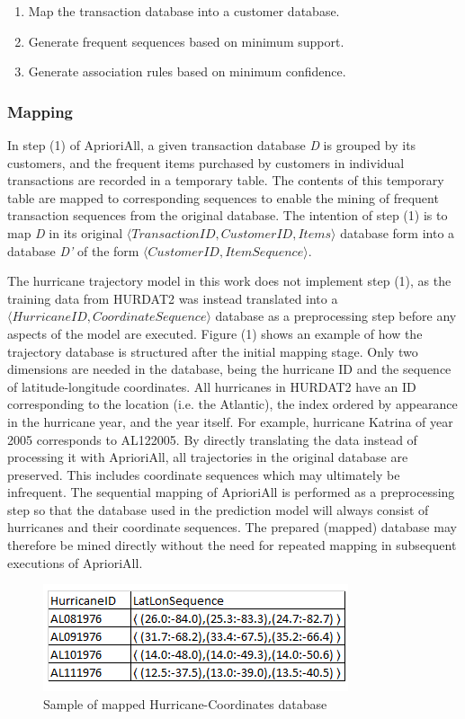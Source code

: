 \documentclass[12pt,conference]{IEEEtran}
\begin{document}
\begin{enumerate}
\item Map the transaction database into a customer database.
\item Generate frequent sequences based on minimum support.
\item Generate association rules based on minimum confidence.
\end{enumerate}

\subsubsection{Mapping}

In step (1) of AprioriAll, a given transaction database \textit{D} is grouped by its customers, and the frequent items purchased by customers in individual transactions are recorded in a temporary table. The contents of this temporary table are mapped to corresponding sequences to enable the mining of frequent transaction sequences from the original database. The intention of step (1) is to map \textit{D} in its original $\langle TransactionID, CustomerID, Items\rangle$ database form into a database \textit{D'} of the form $\langle CustomerID, ItemSequence\rangle$. 

The hurricane trajectory model in this work does not implement step (1), as the training data from HURDAT2 was instead translated into a $\langle HurricaneID, CoordinateSequence\rangle$ database as a preprocessing step before any aspects of the model are executed. Figure (1) shows an example of how the trajectory database is structured after the initial mapping stage. Only two dimensions are needed in the database, being the hurricane ID and the sequence of latitude-longitude coordinates. All hurricanes in HURDAT2 have an ID corresponding to the location (i.e. the Atlantic), the index ordered by appearance in the hurricane year, and the year itself. For example, hurricane Katrina of year 2005 corresponds to AL122005. By directly translating the data instead of processing it with AprioriAll, all trajectories in the original database are preserved. This includes coordinate sequences which may ultimately be infrequent. The sequential mapping of AprioriAll is performed as a preprocessing step so that the database used in the prediction model will always consist of hurricanes and their coordinate sequences. The prepared (mapped) database may therefore be mined directly without the need for repeated mapping in subsequent executions of AprioriAll.

\begin{figure}[ht]
\caption{Sample of mapped Hurricane-Coordinates database}
\centering
\includegraphics[scale=1.0]{hurricane-table-sample}
\end{figure}
\end{document}
